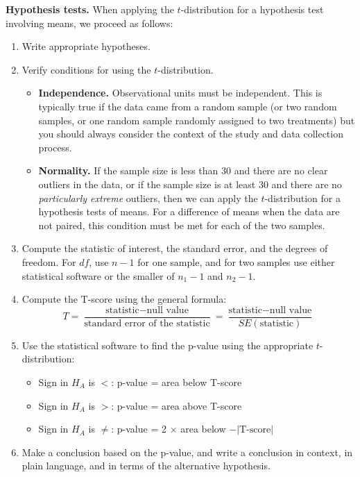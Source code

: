 \documentclass[
  10pt,
  openany]{book}
\providecommand{\tightlist}{%
  \setlength{\itemsep}{0pt}\setlength{\parskip}{0pt}}
\theoremstyle{definition}
\theoremstyle{definition}
\theoremstyle{definition}
\theoremstyle{definition}
\theoremstyle{remark}
\begin{document}
\textbf{Hypothesis tests.} When applying the \(t\)-distribution for a hypothesis test involving means, we proceed as follows:

\begin{enumerate}
\def\labelenumi{\arabic{enumi}.}
\tightlist
\item
  Write appropriate hypotheses.\\
\item
  Verify conditions for using the \(t\)-distribution.

  \begin{itemize}
  \tightlist
  \item
    \textbf{Independence.} Observational units must be independent. This is typically true if the data came from a random sample (or two random samples, or one random sample randomly assigned to two treatments) but you should always consider the context of the study and data collection process.
  \item
    \textbf{Normality.} If the sample size is less than 30 and there are no clear outliers in the data, or if the sample size is at least 30
    and there are no \emph{particularly extreme} outliers,
    then we can apply the \(t\)-distribution for a hypothesis tests of means. For a difference of means when the data are not paired, this condition must be met for each of the two samples.
  \end{itemize}
\item
  Compute the statistic of interest, the standard error, and the degrees of freedom. For \(df\), use \(n-1\) for one sample, and for two samples use either statistical software or the smaller of \(n_1 - 1\) and \(n_2 - 1\).\\
\item
  Compute the T-score using the general formula:
  \[
   T = \frac{\mbox{statistic} - \mbox{null value}}{\mbox{standard error of the statistic}} = \frac{\mbox{statistic} - \mbox{null value}}{SE(\mbox{statistic})}
   \]
\item
  Use the statistical software to find the p-value using the appropriate \(t\)-distribution:

  \begin{itemize}
  \tightlist
  \item
    Sign in \(H_A\) is \(<\): p-value = area below T-score
  \item
    Sign in \(H_A\) is \(>\): p-value = area above T-score
  \item
    Sign in \(H_A\) is \(\neq\): p-value = 2 \(\times\) area below \(-|\mbox{T-score}|\)
  \end{itemize}
\item
  Make a conclusion based on the p-value, and write a conclusion in context, in plain language, and in terms of the alternative hypothesis.
\end{enumerate}
\end{document}
